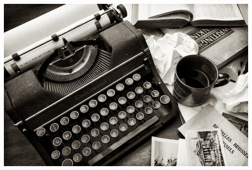 	\begin{Figure}
	 \centering
	 \includegraphics[width=\linewidth]{images/Journalism}
	 \label{fig:Typewriter}
	\end{Figure}


